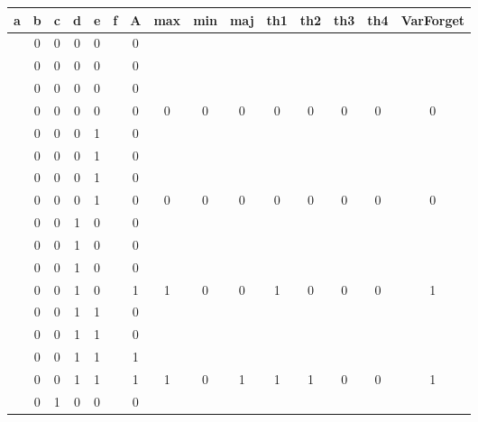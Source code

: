 \begin{table}[!tb]
    \centering
    \begin{tabular}{|c|c|c|c|c|c|c|c|c|c|c|c|c|c|c|}
        \hline
        \textbf{a} & \textbf{b} & \textbf{c} & \textbf{d} & \textbf{e} & \textbf{f} & \textbf{A} & \textbf{max} & \textbf{min} & \textbf{maj} & \textbf{th1} & \textbf{th2} & \textbf{th3} & \textbf{th4} & \textbf{VarForget} \\ \hline
        \rowcolor{gray!40}  & 0 & 0 & 0 & 0 &  & 0 &  &  &  &  &  &  &  &  \\ \hline
        \rowcolor{gray!40}  & 0 & 0 & 0 & 0 &  & 0 &  &  &  &  &  &  &  &  \\ \hline
        \rowcolor{gray!40}  & 0 & 0 & 0 & 0 &  & 0 &  &  &  &  &  &  &  &  \\ \hline
        \rowcolor{gray!40}  & 0 & 0 & 0 & 0 &  & 0 & 0 & 0 & 0 & 0 & 0 & 0 & 0 & 0 \\ \hline
        \rowcolor{blue!40}  & 0 & 0 & 0 & 1 &  & 0 &  &  &  &  &  &  &  &  \\ \hline
        \rowcolor{blue!40}  & 0 & 0 & 0 & 1 &  & 0 &  &  &  &  &  &  &  &  \\ \hline
        \rowcolor{blue!40}  & 0 & 0 & 0 & 1 &  & 0 &  &  &  &  &  &  &  &  \\ \hline
        \rowcolor{blue!40}  & 0 & 0 & 0 & 1 &  & 0 & 0 & 0 & 0 & 0 & 0 & 0 & 0 & 0 \\ \hline
        \rowcolor{red!40}  & 0 & 0 & 1 & 0 &  & 0 &  &  &  &  &  &  &  &  \\ \hline
        \rowcolor{red!40}  & 0 & 0 & 1 & 0 &  & 0 &  &  &  &  &  &  &  &  \\ \hline
        \rowcolor{red!40}  & 0 & 0 & 1 & 0 &  & 0 &  &  &  &  &  &  &  &  \\ \hline
        \rowcolor{red!40}  & 0 & 0 & 1 & 0 &  & 1 & 1 & 0 & 0 & 1 & 0 & 0 & 0 & 1 \\ \hline
        \rowcolor{green!40}  & 0 & 0 & 1 & 1 &  & 0 &  &  &  &  &  &  &  &  \\ \hline
        \rowcolor{green!40}  & 0 & 0 & 1 & 1 &  & 0 &  &  &  &  &  &  &  &  \\ \hline
        \rowcolor{green!40}  & 0 & 0 & 1 & 1 &  & 1 &  &  &  &  &  &  &  &  \\ \hline
        \rowcolor{green!40}  & 0 & 0 & 1 & 1 &  & 1 & 1 & 0 & 1 & 1 & 1 & 0 & 0 & 1 \\ \hline
        \rowcolor{yellow!40}  & 0 & 1 & 0 & 0 &  & 0 &  &  &  &  &  &  &  &  \\ \hline

\end{tabular}
\end{table}
